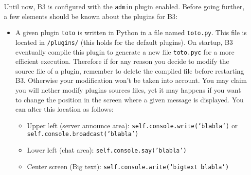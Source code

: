 \noindent Until now, B3 is configured with the \texttt{admin} plugin enabled. 
Before going further, a few elements should be known about the plugins for B3:
\begin{itemize}
\item A given plugin \texttt{toto} is written in Python in a file named
  \texttt{toto.py}. This file is located in \begginstall\texttt{/plugins/} (this
  holds for the default plugins).
  On startup, B3 eventually compile this plugin to generate a new file
  \texttt{toto.pyc} for a more efficient execution. 
  Therefore if for any reason you decide to modify the source file of a plugin,
  remember to delete the compiled file before restarting B3. Otherwise your
  modification won't be taken into account.
  You may claim you will nether modify plugins sources files, yet it may happens
  if you want to change the position in the screen where a given message is
  displayed. You can alter this location as follows:
  \begin{itemize}
  \item Upper left (server announce area): 
    \texttt{self.console.write('blabla')} or \texttt{self.console.broadcast('blabla')}
  \item Lower left (chat area): \texttt{self.console.say('blabla')}
  \item Center screen (Big text): \texttt{self.console.write('bigtext blabla')}
  \end{itemize}




\end{itemize}
